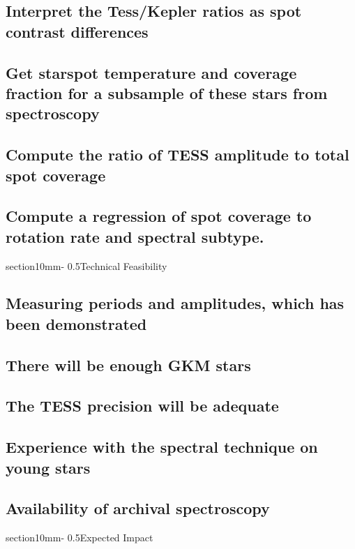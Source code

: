 \documentclass[letterpaper,11pt]{article}
\makeatletter
\renewcommand{\section}{\@startsection%
{section}{1}{0mm}{-\baselineskip}%
{0.5\baselineskip}{\normalfont\Large\bfseries}}%
\makeatother
\begin{document}
\subsection{Interpret the Tess/Kepler ratios as spot contrast differences}
\subsection{Get starspot temperature and coverage fraction for a subsample of these stars from spectroscopy}
\subsection{Compute the ratio of TESS amplitude to total spot coverage}
\subsection{Compute a regression of spot coverage to rotation rate and spectral subtype.}


\section{Technical Feasibility}

\subsection{Measuring periods and amplitudes, which has been demonstrated}
\subsection{There will be enough GKM stars}
\subsection{The TESS precision will be adequate}
\subsection{Experience with the spectral technique on young stars}
\subsection{Availability of archival spectroscopy}

\section{Expected Impact}
\end{document}
